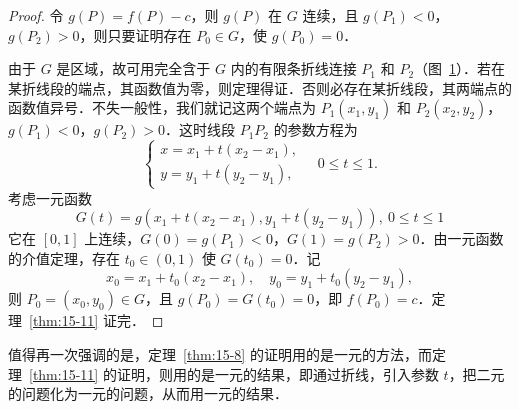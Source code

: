 \begin{proof}
令 $g(P)=f(P)-c$，则 $g(P)$ 在 $G$ 连续，且 $g(P_{1})<0$，$g(P_{2})>0$，则只要证明存在 $P_{0}\in G$，使 $g(P_{0})=0$．

由于 $G$ 是区域，故可用完全含于 $G$ 内的有限条折线连接 $P_{1}$ 和 $P_{2}$（图~\ref{fig:15-20}）．若在某折线段的端点，其函数值为零，则定理得证．否则必存在某折线段，其两端点的函数值异号．不失一般性，我们就记这两个端点为 $P_{1}(x_{1},y_{1})$ 和 $P_{2}(x_{2},y_{2})$，$g(P_{1})<0$，$g(P_{2})>0$．这时线段 $P_{1}P_{2}$ 的参数方程为
\[
\begin{cases}
x=x_{1}+t\left(x_{2}-x_{1}\right),\\
y=y_{1}+t\left(y_{2}-y_{1}\right),
\end{cases}\quad0\leqslant t\leqslant1.
\]
考虑一元函数
\[
G\left(t\right)=g\left(x_{1}+t\left(x_{2}-x_{1}\right),y_{1}+t\left(y_{2}-y_{1}\right)\right),\ 0\leqslant t\leqslant1
\]
它在 $[0,1]$ 上连续，$G(0)=g(P_{1})<0$，$G(1)=g(P_{2})>0$．由一元函数的介值定理，存在 $t_{0}\in(0,1)$ 使 $G(t_{0})=0$．记
\[
x_{0}=x_{1}+t_{0}(x_{2}-x_{1}),\quad y_{0}=y_{1}+t_{0}(y_{2}-y_{1}),
\]
则 $P_{0}=(x_{0},y_{0})\in G$，且 $g\left(P_{0}\right)=G\left(t_{0}\right)=0$，即 $f(P_{0})=c$．定理~\ref{thm:15-11} 证完．
\end{proof}

\begin{figure}[htbp]
\centering
{}\caption{\relax}\label{fig:15-20}
\end{figure}

值得再一次强调的是，定理~\ref{thm:15-8} 的证明用的是一元的方法，而定理~\ref{thm:15-11} 的证明，则用的是一元的结果，即通过折线，引入参数 $t$，把二元的问题化为一元的问题，从而用一元的结果．

